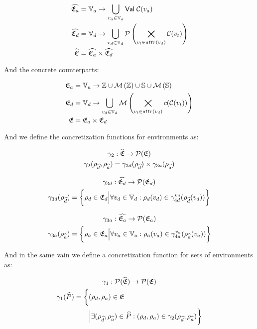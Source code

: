 \begin{align} \label{eq:absenva}
    \ab{\mathfrak{E}_a} &= \mathbb{V}_a \rightarrow \bigcup_{v_a \in \mathbb{V}_a} \mathsf{Val} \; \lookupcl(v_a) \\ \label{eq:absenvd}
    \ab{\mathfrak{E}_d} &= \mathbb{V}_d \rightarrow \bigcup_{v_d \in \mathbb{V}_d} \mathcal{P}\left(\bigtimes_{v_t \in attr(v_d)}\lookupcl(v_t)\right) \\
    \ab{\mathfrak{E}} &= \ab{\mathfrak{E}_a} \times \ab{\mathfrak{E}_d}
\end{align}


And the concrete counterparts:


\begin{align}
    \mathfrak{E}_a &= \mathbb{V}_a \rightarrow \mathbb{Z} \cup \mathcal{M}\left(\mathbb{Z}\right) \cup \mathbb{S} \cup \mathcal{M}\left(\mathbb{S}\right) \\
    \mathfrak{E}_d &= \mathbb{V}_d \rightarrow \bigcup_{v_d \in \mathbb{V}_d} \mathcal{M}\left(\bigtimes_{v_t \in attr(v_d)}c(\mathcal{C}(v_t))\right) \\
    \mathfrak{E} &= \mathfrak{E}_a \times \mathfrak{E}_d
\end{align}


And we define the concretization functions for environments as:


\begin{gather}
    \gamma_2 : \widehat{\mathfrak{E}} \rightarrow \mathcal{P}(\mathfrak{E})\\
    \gamma_2(\rho_{\widehat{d}}, \rho_{\widehat{a}}) = \gamma_{3d}(\rho_{\widehat{d}}) \times \gamma_{3a}(\rho_{\widehat{a}})
\end{gather}


\begin{gather}
    \gamma_{3d} : \widehat{\mathfrak{E}_d} \rightarrow \mathcal{P}(\mathfrak{E}_d)\\
    \gamma_{3d}(\rho_{\widehat{d}}) = \biggl\{ \rho_{d} \in \mathfrak{E}_d \Big| \forall v_d \in \mathbb{V}_d : \rho_d(v_d) \in \gamma^{v_d}_{4d}(\rho_{\widehat{d}}(v_d)) \biggr\}
\end{gather}


\begin{gather}
    \gamma_{3a} : \widehat{\mathfrak{E}_a} \rightarrow \mathcal{P}(\mathfrak{E}_a)\\
    \gamma_{3a}(\rho_{\widehat{a}}) = \biggl\{ \rho_{a} \in \mathfrak{E}_a \Big| \forall v_a \in \mathbb{V}_a : \rho_a(v_a) \in \gamma^{v_a}_{4a}(\rho_{\widehat{a}}(v_a)) \biggr\}
\end{gather}


And in the same vain we define a concretization function for sets of environments as:


\begin{gather}
    \gamma_1 : \mathcal{P}(\widehat{\mathfrak{E}}) \rightarrow \mathcal{P}(\mathfrak{E})\\
    \begin{split}
        \gamma_1(\widehat{P}) = \biggl\{ &(\rho_{d}, \rho_{a}) \in \mathfrak{E} \\
        &\Big| \exists (\rho_{\widehat{d}}, \rho_{\widehat{a}}) \in \widehat{P} : (\rho_{d}, \rho_{a}) \in \gamma_2(\rho_{\widehat{d}}, \rho_{\widehat{a}})\biggr\}
    \end{split}
\end{gather}

